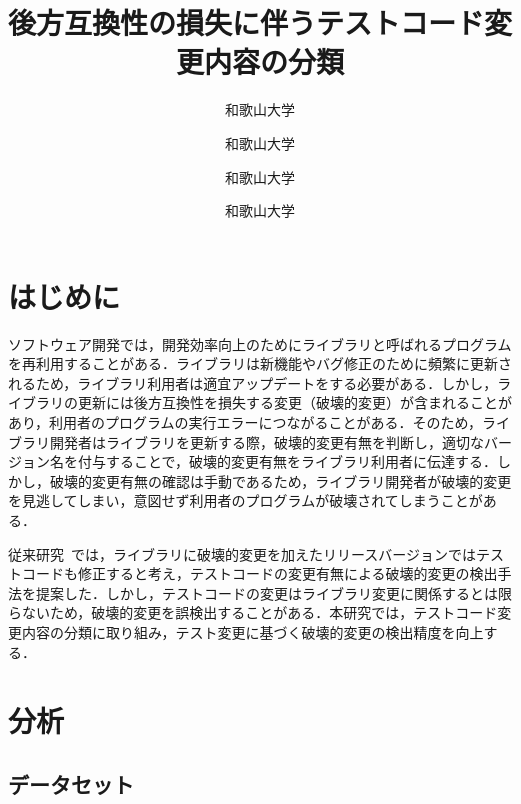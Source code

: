 \documentclass[uplatex,dvipdfmx,a4paper,twocolumn,base=11pt,jbase=11pt,ja=standard]{bxjsarticle}  %
\title{後方互換性の損失に伴うテストコード変更内容の分類}{A classification of test code changes accompanied by a lack of backward compatibility}
\author{和歌山大学}{前川　大樹}{Daiki Maekawa, Wakayama University}
\author{和歌山大学}{伊原　彰紀}{Akinori Ihara, Wakayama University}
\author{和歌山大学}{大森　楓己}{Fuki Omori, Wakayama University}
\author{和歌山大学}{才木　一也}{Kazuya Saiki, Wakayama University}
\begin{document}
\maketitle

\section{はじめに}

ソフトウェア開発では，開発効率向上のためにライブラリと呼ばれるプログラムを再利用することがある．ライブラリは新機能やバグ修正のために頻繁に更新されるため，ライブラリ利用者は適宜アップデートをする必要がある．しかし，ライブラリの更新には後方互換性を損失する変更（破壊的変更）が含まれることがあり，利用者のプログラムの実行エラーにつながることがある．そのため，ライブラリ開発者はライブラリを更新する際，破壊的変更有無を判断し，適切なバージョン名を付与することで，破壊的変更有無をライブラリ利用者に伝達する．しかし，破壊的変更有無の確認は手動であるため，ライブラリ開発者が破壊的変更を見逃してしまい，意図せず利用者のプログラムが破壊されてしまうことがある．

従来研究~\cite{FOSE2021_Matsuda}では，ライブラリに破壊的変更を加えたリリースバージョンではテストコードも修正すると考え，テストコードの変更有無による破壊的変更の検出手法を提案した．しかし，テストコードの変更はライブラリ変更に関係するとは限らないため，破壊的変更を誤検出することがある．本研究では，テストコード変更内容の分類に取り組み，テスト変更に基づく破壊的変更の検出精度を向上する．


\section{分析}
\subsection{データセット}
\end{document}
